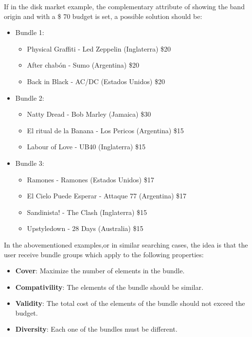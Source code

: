 If in the disk market example, the complementary attribute of showing the band origin and with a \$ 70 budget is set, a possible solution should be:
\begin{itemize}
  \item Bundle 1:
  \begin{itemize}
    \item Physical Graffiti - Led Zeppelin (Inglaterra) \$20
    \item After chabón - Sumo (Argentina) \$20
    \item Back in Black - AC/DC (Estados Unidos) \$20
  \end{itemize}
  \item Bundle 2:
  \begin{itemize}
    \item Natty Dread - Bob Marley (Jamaica) \$30
    \item El ritual de la Banana - Los Pericos (Argentina) \$15
    \item Labour of Love - UB40 (Inglaterra) \$15
  \end{itemize}
	  \item Bundle 3:
  \begin{itemize}
    \item Ramones - Ramones (Estados Unidos) \$17
    \item El Cielo Puede Esperar - Attaque 77 (Argentina) \$17
    \item Sandinista! - The Clash (Inglaterra) \$15
		\item Upstyledown - 28 Days (Australia) \$15
  \end{itemize}
\end{itemize}
In the abovementioned examples,or in similar searching cases, the idea is that the user receive bundle groups which apply to the following properties: 
\begin{itemize}
  \item \textbf{Cover}: Maximize the number of elements in the bundle.
  \item \textbf{Compativility}: The elements of the bundle should be similar.
  \item \textbf{Validity}: The total cost of the elements of the bundle should not exceed the budget.
  \item \textbf{Diversity}: Each one of the bundles must be different.
\end{itemize}
